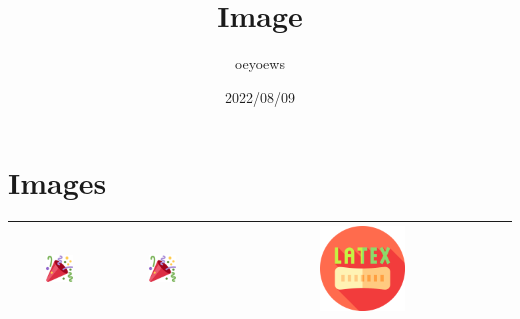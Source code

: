 \documentclass{article}
\title{Image \emoji{book}}
\author{oeyoews}
\date{2022/08/09}
\begin{document}
\maketitle

\section{ Images}
\label{sec:img}

\begin{table}
\begin{tabular}{|c|c|c|}\hline
	\includegraphics[width=0.3\textwidth]{tw-tada} & \includegraphics[width=0.3\textwidth]{tw-tada} & \includegraphics[width=0.3\textwidth]{latex} \\\hline

\end{tabular}
\end{table}
\end{document}
